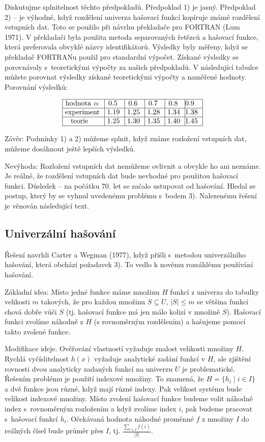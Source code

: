 \documentclass[a4paper,12pt]{article}
\begin{document}
Diskutujme splnitelnost těchto předpokladů.\newline 
Předpoklad 1) je jasný.\newline 
Předpoklad 2) -- je výhodné, 
když rozdělení univerza hašovací funkcí kopíruje známé 
rozděle\-ní vstupních dat. Toto se použilo při návrhu 
překladače pro FORTRAN (Lum 1971). V překladači byla použita metoda separovaných řetězců a hašovací funkce, 
která preferovala obvyklé názvy identifikátorů. Výsledky byly měřeny, když se překladač FORTRANu použil pro standardní výpočet. Získané výsledky se porovnávaly s~teoretickými výpočty za našich předpokladů. V 
následující tabulce můžete porovnat výsledky 
získané teoretickými výpočty a naměřené hodnoty.
Porovnání výsledků:

$$\vtop{\offinterlineskip\halign {\strut\vrule\ # & \vrule\ # & \vrule\ # & \vrule\ # & \vrule\ # & \vrule \hfil # \hfil \vrule\cr\noalign{\hrule}hodnota $\alpha$ & 0.5 & 0.6 & 0.7 & 0.8 & 0.9 \hfill \cr\noalign{\hrule}experiment & 1.19 & 1.25 & 1.28 & 1.34 & 1.38 \cr\noalign{\hrule}teorie & 1.25 & 1.30 & 1.35 & 1.40 & 1.45 \cr\noalign{\hrule}}}$$

Závěr: Podmínky 1) a 2) můžeme splnit, 
když známe rozložení vstupních dat, můžeme 
dosáhnout ještě lepších výsledků.

Nevýhoda: Rozložení vstupních dat 
nemůžeme ovlivnit a obvykle ho ani neznáme. Je 
reálné, že rozdělení vstupních dat bude nevhodné pro 
použitou hašovací funkci. Důsledek -- na počátku 
70. let se začalo ustupovat od hašování. Hledal se postup, 
který by se vyhnul uvedenému problému s~bodem 3). Nalezenému 
řešení je věnován následující text.

\subsection{Univerzální hašování}

Řešení navrhli Carter a Wegman (1977), když přišli s~metodou univerzálního hašování, která obchází poža\-davek 3).  
To vedlo k novému rozsáhlému používání hašování.  

Základní idea: Místo jedné funkce máme 
množinu $H$ funkcí z univerza do tabulky velikosti $m$ 
takových, že pro každou množinu $S\subseteq U$, $|S|\le 
m$ se 
většina funkcí chová dobře vůči $S$ (tj. hašovací funkce má jen málo kolizí v množině $S$). 
Hašovací funkci 
zvolíme náhodně z $H$ (s rovnoměrným rozdělením) a hašujeme  
pomocí takto zvo\-lené funkce. 

Modifikace ideje. Ověřování vlastností vyžaduje 
znalost velikosti množiny $H$. Rychlá vyčíslitelnost $
h(x)$ 
vyžaduje ana\-lytické zadání funkcí v $H$, ale zjištění rovnosti 
dvou analy\-ticky zadaných funkcí na univerzu $U$ je 
problematické. Řešením problému je použití indexové množiny. 
To znamená, že $H=\{h_i\mid i\in I\}$ a dvě funkce jsou různé, 
když mají různé indexy. Pak velikost systému bude 
velikost indexové množiny. Místo zvolení hašovací funkce 
budeme volit náhodně index s~rovnoměrným rozložením a když 
zvolíme index $i$, pak budeme pracovat s~hašovací funkcí $
h_i$. 
Očekávaná hodnota náhodné proměnné $f$ z množiny $
I$ do 
reálných čísel bude průměr přes $I$, tj. $\frac {
\sum_{i\in I}f(i)}{|I|}$.
\end{document}

